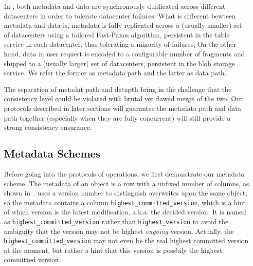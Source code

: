 In {\name}, both metadata and data are synchronously duplicated across different
datacenters in order to tolerate datacenter failures. What is different bewteen metadata
and data is, metadata is fully replicated across a (usually smaller) set of datacenters using
a tailored Fast-Paxos algorithm, persistent in the table service in each datacenter, thus
tolerating a minority of failures; On the other hand, data in user request is encoded to
a configurable number of fragments and shipped to a (usually larger) set of datacenters,
persistent in the blob storage service. We refer the former as metadata path and the latter
as data path.


The separation of metadat path and datapth bring in the challenge that the consistency level
could be violated with brutal yet flawed merge of the two. Our protocols described in later
sections will guarantee the metadata path and data path together (especially when they are
fully concurrent) will still provide a strong consistency ensurance.




\subsection{Metadata Schemes}
Before going into the protocols of {\name} operations, we first demonstrate our metadata
scheme. The metadata of an object is a row with a unfixed number of columns, as shown
in~. {\name} uses a version number to distinguish overwrites upon the same
object, so the metadata contains a column \texttt{highest\_committed\_version}, which is
a hint of which version is the latest modification, a.k.a. the decided version. It is named
as \texttt{highest\_committed\_version} rather than \texttt{highest\_version} to avoid the
ambiguity that the version may not be highest \emph{ongoing} version. Actually, the
\texttt{highest\_committed\_version} may not even be the real highest committed version at
the moment, but rather a hint that this version is possbily the highest committed version.

